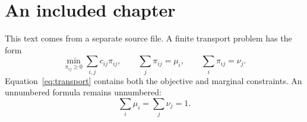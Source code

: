 \section{An included chapter}
This text comes from a separate source file. A finite transport problem has the form
\begin{equation}\label{eq:transport}
\min_{\pi_{ij}\ge0}\sum_{i,j}c_{ij}\pi_{ij},
\qquad \sum_j\pi_{ij}=\mu_i,\qquad\sum_i\pi_{ij}=\nu_j.
\end{equation}
Equation~\eqref{eq:transport} contains both the objective and marginal constraints.
An unnumbered formula remains unnumbered:
\begin{equation*}
\sum_i\mu_i=\sum_j\nu_j=1.
\end{equation*}
